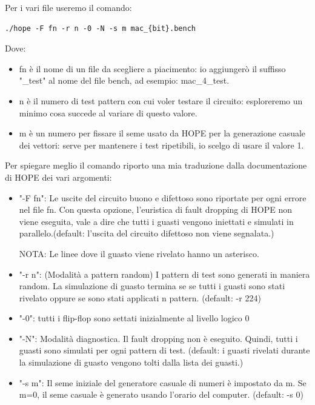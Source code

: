 \documentclass[12pt, letterpaper]{article}
\begin{document}
Per i vari file useremo il comando: 

\begin{lstlisting}
./hope -F fn -r n -0 -N -s m mac_{bit}.bench
\end{lstlisting}

Dove:
\begin{itemize}
\item fn è il nome di un file da scegliere a piacimento: io aggiungerò il suffisso "\_test" al nome del file bench, ad esempio: mac\_4\_test. 
\item n è il numero di test pattern con cui voler testare il circuito: esploreremo un minimo cosa succede al variare di questo valore.
\item m è un numero per fissare il seme usato da HOPE per la generazione casuale dei vettori: serve per mantenere i test ripetibili, io scelgo di usare il valore 1.
\end{itemize}

Per spiegare meglio il comando riporto una mia traduzione dalla documentazione di HOPE dei vari argomenti:

\begin{itemize}
\item "-F fn": Le uscite del circuito buono e difettoso sono riportate per ogni errore nel file fn. Con questa opzione, l'euristica di fault dropping di HOPE non viene eseguita, vale a dire che tutti i guasti vengono iniettati e simulati in parallelo.(default: l'uscita del circuito difettoso non viene segnalata.) 

NOTA: Le linee dove il guasto viene rivelato hanno un asterisco.

\item "-r n": (Modalità a pattern random)
I pattern di test sono generati in maniera random. La simulazione di guasto termina se se tutti i guasti sono stati rivelato oppure se sono stati applicati n pattern. (default: -r 224)

\item "-0": tutti i flip-flop sono settati inizialmente al livello logico 0

\item "-N": Modalità diagnostica. Il fault dropping non è eseguito. Quindi, tutti i guasti sono simulati per ogni pattern di test. (default: i guasti rivelati durante la simulazione di guasto vengono tolti dalla lista dei guasti.)

\item "-s m": Il seme iniziale del generatore casuale di numeri è impostato da m.
Se m=0, il seme casuale è generato usando l'orario del computer. (default: -s 0)

\end{itemize}
\end{document}
